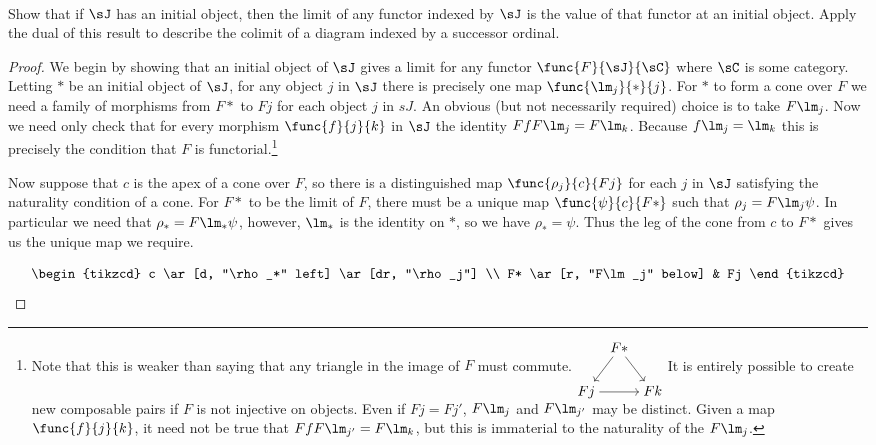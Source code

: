 \documentclass[../../main]{subfiles}
\begin{document}
\paragraph{}
\begin{exercise}
	Show that if \(\sJ\) has an initial object, then the limit of any functor
	indexed by \(\sJ\) is the value of that functor at an initial object. Apply
	the dual of this result to describe the colimit of a diagram indexed by a
	successor ordinal.
\end{exercise}

\begin{proof}
	We begin by showing that an initial object of \(\sJ\) gives a limit for any
	functor \(\func{F}{\sJ}{\sC}\) where \(\sC\) is some category. Letting \(*\)
	be an initial object of \(\sJ\), for any object \(j\) in \(\sJ\) there is
	precisely one map \(\func{\lm_j}{*}{j}\). For \(*\) to form a cone over
	\(F\) we need a family of morphisms from \(F*\) to \(Fj\) for each object
	\(j\) in \(sJ\). An obvious (but not necessarily required) choice is to take
	\(F\lm_j\). Now we need only check that for every morphism
	\(\func{f}{j}{k}\) in \(\sJ\) the identity \(FfF\lm_j=F\lm_k\). Because
	\(f\lm_j=\lm_k\) this is precisely the condition that \(F\) is
	functorial.\footnote{Note that this is weaker than saying that any triangle
		in the image of \(F\) must commute.
		\(\begin{tikzcd}[ampersand replacement=\&, cramped, column sep=.5em]
			\&F* \ar[dr] \ar[dl] \\ Fj \ar[rr] \&\& Fk
		\end{tikzcd}\) It is entirely possible to create new composable pairs if
		\(F\) is not injective on objects. Even if \(Fj=Fj'\), \(F\lm_j\) and
		\(F\lm_{j'}\) may be distinct. Given a map \(\func{f}{j}{k}\), it need
		not be true that \(FfF\lm_{j'}=F\lm_k\), but this is immaterial to the
		naturality of the \(F\lm_j\).}

	Now suppose that \(c\) is the apex of a cone over \(F\), so there is a
	distinguished map \(\func{\rho_j}{c}{Fj}\) for each \(j\) in \(\sJ\)
	satisfying the naturality condition of a cone. For \(F*\) to be the limit of
	\(F\), there must be a unique map \(\func{\psi}{c}{F*}\) such that
	\(\rho_j=F\lm_j\psi\). In particular we need that \(\rho_*=F\lm_*\psi\),
	however, \(\lm_*\) is the identity on \(*\), so we have \(\rho_*=\psi\).
	Thus the leg of the cone from \(c\) to \(F*\) gives us the unique map we
	require.

	\[\begin{tikzcd}
			c \ar[d, "\rho_*" left] \ar[dr, "\rho_j"] \\
			F* \ar[r, "F\lm_j" below] & Fj
	\end{tikzcd}\]


\end{proof}
\end{document}
